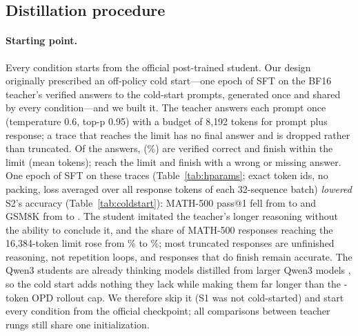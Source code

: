 

\subsection{Distillation procedure}\label{sec:setup-method}
\paragraph{Starting point.} Every condition starts from the official post-trained student. Our
design originally prescribed an off-policy cold start---one epoch of SFT on the BF16 teacher's
verified answers to the \nColdstart{} cold-start prompts, generated once and shared by every
condition---and we built it. The teacher answers each prompt once (temperature 0.6, top-p 0.95)
with a budget of 8{,}192 tokens for prompt plus response; a trace that reaches the limit has no
final answer and is dropped rather than truncated. Of the \nColdstart{} answers, \csKept{}
(\csKeptPct\%) are verified correct and finish within the limit (mean \csMeanTok{} tokens);
\csAtLimit{} reach the limit and \csWrong{} finish with a wrong or missing answer. One epoch of SFT
on these traces (Table~\ref{tab:hparams}; exact token ids, no packing, loss averaged over all
response tokens of each 32-sequence batch) \emph{lowered} S2's accuracy
(Table~\ref{tab:coldstart}): MATH-500 pass@1 fell from \csTwoMathBefore{} to \csTwoMathAfter{}
and GSM8K from \csTwoGsmBefore{} to \csTwoGsmAfter{}. The student imitated the teacher's longer
reasoning without the ability to conclude it, and the share of MATH-500 responses reaching the
16{,}384-token limit rose from \csTwoMathTruncBefore\% to \csTwoMathTruncAfter\%; most truncated
responses are unfinished reasoning, not repetition loops, and responses that do finish remain
accurate. The Qwen3 students are already thinking models distilled from larger Qwen3
models \citep{qwen3}, so the cold start adds nothing they lack while making them far longer than
the \rolloutMaxTok{}-token OPD rollout cap. We therefore skip it (S1 was not cold-started) and
start every condition from the official checkpoint; all comparisons between teacher rungs still
share one initialization.



